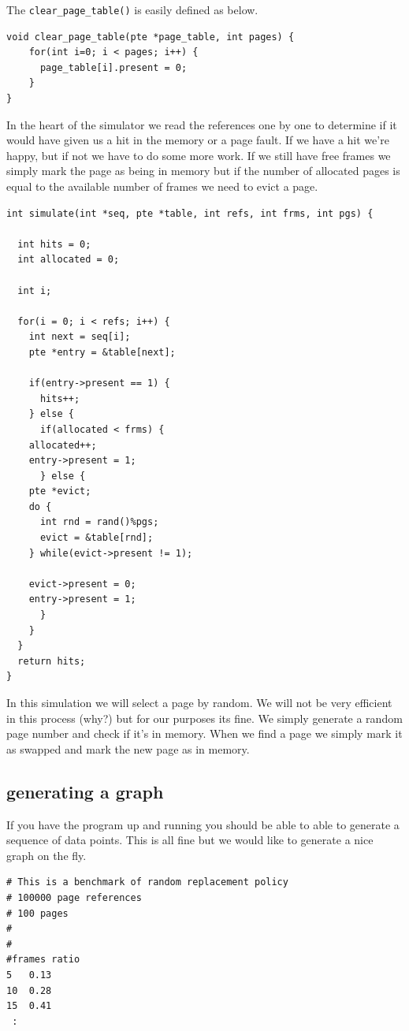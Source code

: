 \documentclass[a4paper,11pt]{article}
\begin{document}
The {\tt clear\_page\_table()} is easily defined as below.

\begin{lstlisting}
void clear_page_table(pte *page_table, int pages) {
    for(int i=0; i < pages; i++) {
      page_table[i].present = 0;
    }
}
\end{lstlisting}


In the heart of the simulator we read the references one by one to
determine if it would have given us a hit in the memory or a page
fault. If we have a hit we're happy, but if not we have to do some
more work. If we still have free frames we simply mark the page as being in
memory but if the number of allocated pages is equal to the available
number of frames we need to evict a page. 

\begin{lstlisting}
int simulate(int *seq, pte *table, int refs, int frms, int pgs) {

  int hits = 0;
  int allocated = 0;
    
  int i;
	
  for(i = 0; i < refs; i++) {
    int next = seq[i];
    pte *entry = &table[next];

    if(entry->present == 1) {
      hits++;
    } else {
      if(allocated < frms) {
	allocated++;
	entry->present = 1;
      } else {
	pte *evict;
	do {
	  int rnd = rand()%pgs;
	  evict = &table[rnd];
	} while(evict->present != 1);

	evict->present = 0;
	entry->present = 1;
      }
    }
  }
  return hits;
}
\end{lstlisting}

In this simulation we will select a page by random. We will not be very
efficient in this process (why?) but for our purposes its fine. We
simply generate a random page number and check if it's in memory. When
we find a page we simply mark it as swapped and mark the new page as
in memory.

\subsection{generating a graph}

If you have the program up and running you should be able to able to
generate a sequence of data points. This is all fine but we would like
to generate a nice graph on the fly.

\begin{verbatim}
# This is a benchmark of random replacement policy
# 100000 page references
# 100 pages 
#
#
#frames	ratio
5	0.13
10	0.28
15	0.41
 :
\end{verbatim}
\end{document}
